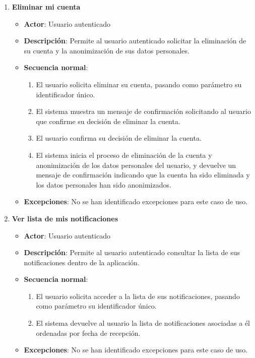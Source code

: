 \begin{enumerate}[label=UC-\protect\twodigits{\arabic*}:, align=left, leftmargin=*]
\item \textbf{Eliminar mi cuenta}
\begin{itemize}
\item \textbf{Actor}: Usuario autenticado
\item \textbf{Descripción}: Permite al usuario autenticado solicitar la eliminación de su cuenta y la anonimización de sus datos personales.
\item \textbf{Secuencia normal}:
\begin{enumerate}[label={\arabic*}:]
\item El usuario solicita eliminar su cuenta, pasando como parámetro su identificador único.
\item El sistema muestra un mensaje de confirmación solicitando al usuario que confirme su decisión de eliminar la cuenta.
\item El usuario confirma su decisión de eliminar la cuenta.
\item El sistema inicia el proceso de eliminación de la cuenta y anonimización de los datos personales del usuario, y devuelve un mensaje de confirmación indicando que la cuenta ha sido eliminada y los datos personales han sido anonimizados.
\end{enumerate}
\item \textbf{Excepciones}: No se han identificado excepciones para este caso de uso.
\end{itemize}

\item \textbf{Ver lista de mis notificaciones}
\begin{itemize}
\item \textbf{Actor}: Usuario autenticado
\item \textbf{Descripción}: Permite al usuario autenticado consultar la lista de sus notificaciones dentro de la aplicación.
\item \textbf{Secuencia normal}:
\begin{enumerate}[label={\arabic*}:]
\item El usuario solicita acceder a la lista de sus notificaciones, pasando como parámetro su identificador único.
\item El sistema devuelve al usuario la lista de notificaciones asociadas a él ordenadas por fecha de recepción.
\end{enumerate}
\item \textbf{Excepciones}: No se han identificado excepciones para este caso de uso.
\end{itemize}


\end{enumerate}
